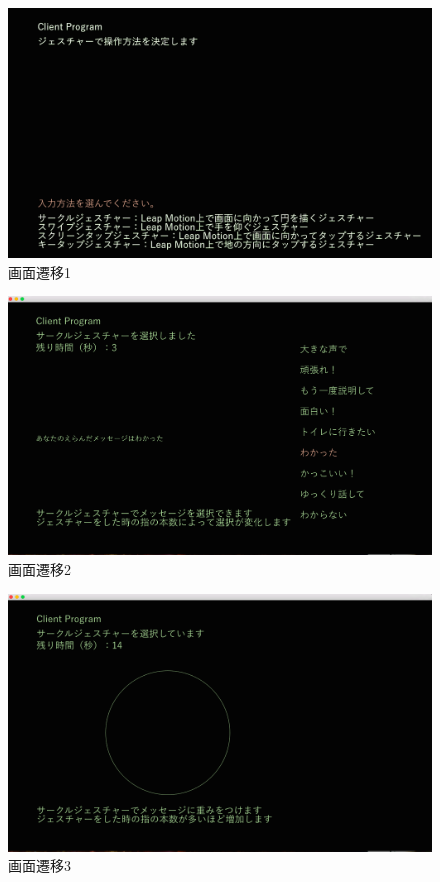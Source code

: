 \documentclass{funthesis}
\begin{document}
\begin{figure}[H]
  \begin{center}
  \includegraphics[width=120mm]{./img/clseni1.png}
  \end{center}
  \caption{画面遷移1}
  \label{senni1}
 \end{figure}
 
 \begin{figure}
  \begin{center}
  \includegraphics[width=120mm]{./img/clseni2.png}
  \end{center}
  \caption{画面遷移2}
  \label{senni2}
  \end{figure}
   \begin{figure}
  \begin{center}
  \includegraphics[width=120mm]{./img/clseni3.png}
  \end{center}
  \caption{画面遷移3}
  \label{senni3}
\end{figure}
\end{document}
